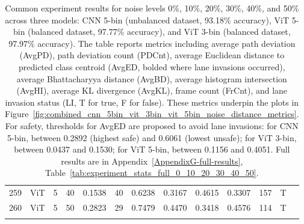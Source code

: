 \begin{longtable}{@{}cllrrrrrrrrrc@{}}
259 & ViT & 5 & 40 & 0.1538 & 40 & 0.6238 & 0.3167 & 0.4615 & 0.3307 & 157 & T \\
260 & ViT & 5 & 50 & 0.2823 & 29 & 0.7479 & 0.4470 & 0.3418 & 0.4576 & 114 & T \\
\bottomrule
\caption{Common experiment results for noise levels 0\%, 10\%, 20\%, 30\%, 40\%, and 50\% across three models: CNN 5-bin (unbalanced dataset, 93.18\% accuracy), ViT 5-bin (balanced dataset, 97.77\% accuracy), and ViT 3-bin (balanced dataset, 97.97\% accuracy). The table reports metrics including average path deviation (AvgPD), path deviation count (PDCnt), average Euclidean distance to predicted class centroid (AvgED, bolded where lane invasions occurred), average Bhattacharyya distance (AvgBD), average histogram intersection (AvgHI), average KL divergence (AvgKL), frame count (FrCnt), and lane invasion status (LI, T for true, F for false). These metrics underpin the plots in Figure~\ref{fig:combined_cnn_5bin_vit_3bin_vit_5bin_noise_distance_metrics}. For safety, thresholds for AvgED are proposed to avoid lane invasions: for CNN 5-bin, between 0.2892 (highest safe) and 0.6061 (lowest unsafe); for ViT 3-bin, between 0.0437 and 0.1530; for ViT 5-bin, between 0.1156 and 0.4051. Full results are in Appendix~\ref{AppendixG-full-results}, Table~\ref{tab:experiment_stats_full_0_10_20_30_40_50}.}
\label{tab:experiment_stats_common_0_10_20_30_40_50}
\end{longtable}




